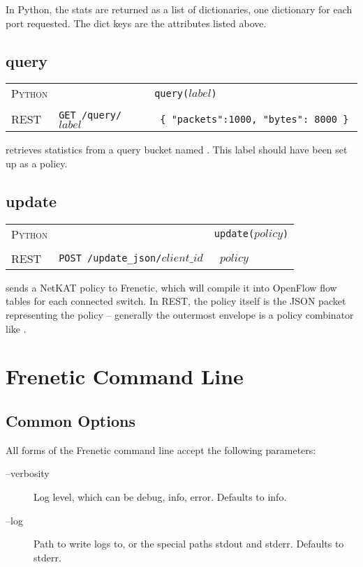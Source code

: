 In Python, the stats are returned as a list of dictionaries, one dictionary for each port requested.  The dict 
keys are the attributes listed above.

\subsection{query}

\bigskip
\begin{tabularx}{\linewidth}{llX}
\textsc{Python} &  & \texttt{query($label$)} \\ \\
\textsc{REST} & \texttt{GET /query/$label$} & 
  \texttt{ \{ "packets":1000, "bytes": 8000 \} } 
\end{tabularx}

 retrieves statistics from a query bucket named .  This label should have
been set up as a  policy.

\subsection{update}

\bigskip
\begin{tabularx}{\linewidth}{llX}
\textsc{Python} &  & \texttt{update($policy$)} \\ \\
\textsc{REST} & \texttt{POST /update\_json/$client\_id$} & 
  \texttt{ $policy$ } 
\end{tabularx}

 sends a NetKAT policy to Frenetic, which will compile it into OpenFlow flow tables for
each connected switch.  In REST, the policy itself is the JSON packet representing the policy -- generally
the outermost envelope is a policy combinator like .

\section{Frenetic Command Line}

\subsection{Common Options}

All forms of the Frenetic command line accept the following parameters:

\begin{description}
\item[--verbosity] Log level, which can be debug, info, error.  Defaults to info.   
\item[--log] Path to write logs to, or the special paths stdout and stderr.  Defaults to stderr.  
\end{description}

